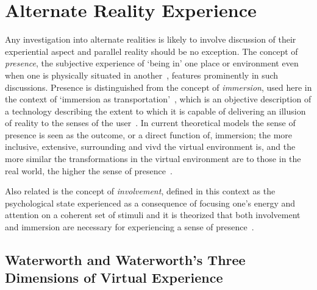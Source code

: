 
\section{Alternate Reality Experience}

\label{lit-review-presencec}
Any investigation into alternate realities is likely to involve discussion of their experiential aspect and parallel reality should be no exception. The concept of \textit{presence}, the subjective experience of `being in' one place or environment even when one is physically situated in another~\cite{Witmer1998}, features prominently in such discussions. Presence is distinguished from the concept of \textit{immersion}, used here in the context of `immersion as transportation'~\cite{Calleja2014}, which is an objective description of a technology describing the extent to which it is capable of delivering an illusion of reality to the senses of the user~\cite{Slater1997}. In current theoretical models the sense of presence is seen as the outcome, or a direct function of, immersion; the more inclusive, extensive, surrounding and vivd the virtual environment is, and the more similar the transformations in the virtual environment are to those in the real world, the higher the sense of presence~\cite{Constantin2003}.

Also related is the concept of \textit{involvement}, defined in this context as the psychological state experienced as a consequence of focusing one's energy and attention on a coherent set of stimuli and it is theorized that both involvement and immersion are necessary for experiencing a sense of presence~\cite{Witmer1998}.

\subsection{Waterworth and Waterworth's Three Dimensions of Virtual Experience}
\label{waterworthandwaterworth}
\newcommand{\presencefootnote}{\footnote{\textbf{Presence} in the context of this model is defined as a state of heightened perceptual processing of environmental stimuli (\textit{``a psychological focus on direct perceptual processing''}~\cite{Waterworth2001}) accompanied by lessened conceptual reasoning, covering cases both in which the environmental stimuli originate from the subject's immediate real surroundings (\textit{unmediated presence}) and in which the environmental stimuli originate from a remote real environment, virtual environment or mixed reality environment (\textit{mediated presence})~\cite{Mantovani2010}.}}

